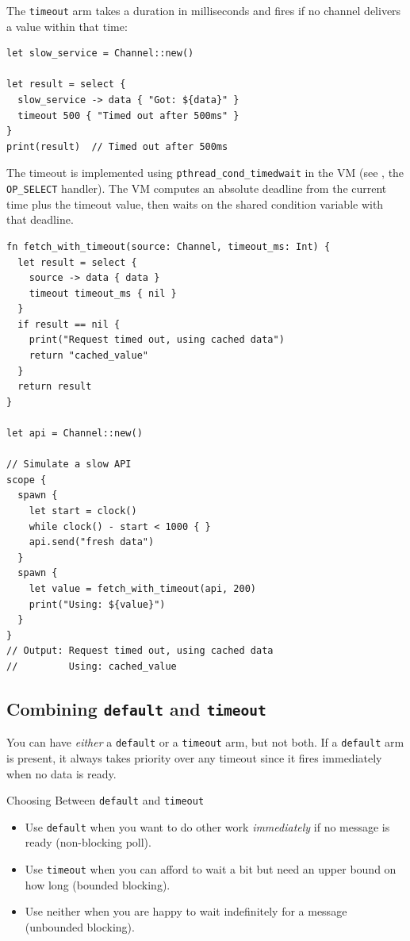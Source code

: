 The \lstinline|timeout| arm takes a duration in milliseconds and fires if no channel delivers a value within that time:

\begin{lstlisting}[language=Lattice, caption={Select with timeout}]
let slow_service = Channel::new()

let result = select {
  slow_service -> data { "Got: ${data}" }
  timeout 500 { "Timed out after 500ms" }
}
print(result)  // Timed out after 500ms
\end{lstlisting}

The timeout is implemented using \texttt{pthread\_cond\_timedwait} in the VM (see , the \texttt{OP\_SELECT} handler).
The VM computes an absolute deadline from the current time plus the timeout value, then waits on the shared condition variable with that deadline.

\begin{lstlisting}[language=Lattice, caption={Timeout with fallback logic}]
fn fetch_with_timeout(source: Channel, timeout_ms: Int) {
  let result = select {
    source -> data { data }
    timeout timeout_ms { nil }
  }
  if result == nil {
    print("Request timed out, using cached data")
    return "cached_value"
  }
  return result
}

let api = Channel::new()

// Simulate a slow API
scope {
  spawn {
    let start = clock()
    while clock() - start < 1000 { }
    api.send("fresh data")
  }
  spawn {
    let value = fetch_with_timeout(api, 200)
    print("Using: ${value}")
  }
}
// Output: Request timed out, using cached data
//         Using: cached_value
\end{lstlisting}

\subsection{Combining \texttt{default} and \texttt{timeout}}

You can have \emph{either} a \lstinline|default| or a \lstinline|timeout| arm, but not both.
If a \lstinline|default| arm is present, it always takes priority over any timeout since it fires immediately when no data is ready.

\begin{tipbox}{Choosing Between \texttt{default} and \texttt{timeout}}
\begin{itemize}
  \item Use \lstinline|default| when you want to do other work \emph{immediately} if no message is ready (non-blocking poll).
  \item Use \lstinline|timeout| when you can afford to wait a bit but need an upper bound on how long (bounded blocking).
  \item Use neither when you are happy to wait indefinitely for a message (unbounded blocking).
\end{itemize}
\end{tipbox}

